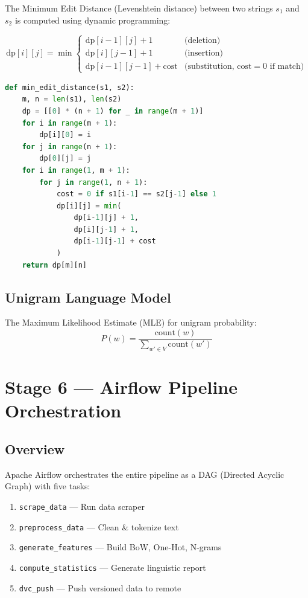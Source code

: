 \documentclass[12pt,a4paper]{article}
\begin{document}
The Minimum Edit Distance (Levenshtein distance) between two strings $s_1$ and $s_2$ is computed using dynamic programming:

\[
\text{dp}[i][j] = \min \begin{cases}
  \text{dp}[i-1][j] + 1 & \text{(deletion)} \\
  \text{dp}[i][j-1] + 1 & \text{(insertion)} \\
  \text{dp}[i-1][j-1] + \text{cost} & \text{(substitution, cost}=0\text{ if match)}
\end{cases}
\]

\begin{lstlisting}[language=Python,caption={Minimum Edit Distance implementation}]
def min_edit_distance(s1, s2):
    m, n = len(s1), len(s2)
    dp = [[0] * (n + 1) for _ in range(m + 1)]
    for i in range(m + 1):
        dp[i][0] = i
    for j in range(n + 1):
        dp[0][j] = j
    for i in range(1, m + 1):
        for j in range(1, n + 1):
            cost = 0 if s1[i-1] == s2[j-1] else 1
            dp[i][j] = min(
                dp[i-1][j] + 1,
                dp[i][j-1] + 1,
                dp[i-1][j-1] + cost
            )
    return dp[m][n]
\end{lstlisting}

\subsection{Unigram Language Model}

The Maximum Likelihood Estimate (MLE) for unigram probability:
\[
P(w) = \frac{\text{count}(w)}{\sum_{w' \in V} \text{count}(w')}
\]

\section{Stage 6 — Airflow Pipeline Orchestration}

\subsection{Overview}

Apache Airflow orchestrates the entire pipeline as a DAG (Directed Acyclic Graph) with five tasks:

\begin{enumerate}
  \item \texttt{scrape\_data} — Run data scraper
  \item \texttt{preprocess\_data} — Clean \& tokenize text
  \item \texttt{generate\_features} — Build BoW, One-Hot, N-grams
  \item \texttt{compute\_statistics} — Generate linguistic report
  \item \texttt{dvc\_push} — Push versioned data to remote
\end{enumerate}
\end{document}
